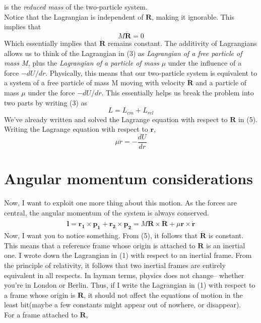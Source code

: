 \documentclass[12pt, letterpaper]{article}
\begin{document}
is the \textit{reduced mass} of the two-particle system. \\
Notice that the Lagrangian is independent of $\mathbf{R}$, making it ignorable. This implies that
\begin{equation}
    M\ddot{\mathbf{R}}=0
\end{equation}
Which essentially implies that $\mathbf{\dot{R}}$ remains constant.
The additivity of Lagrangians allows us to think of the Lagrangian in (3) as \textit{Lagrangian of a free particle of mass M}, plus the \textit{Lagrangian of a particle of mass $\mu$} under the influence of a force $-d U/d r$.
Physically, this means that our two-particle system is equivalent to a system of a free particle of mass M moving with velocity $\mathbf{\dot{R}}$ and a particle of mass $\mu$ under the force $-d U/d r$. This essentially helps us break the 
problem into two parts by writing (3) as  
\begin{equation}
    L = L_{cm}+L_{rel} 
\end{equation}
We've already written and solved the Lagrange equation with respect to $\mathbf{R}$ in (5). Writing the Lagrange equation with respect to $\mathbf{r}$,
\begin{equation}
    \mu\ddot{r}=-\frac{dU}{dr}
\end{equation}
\section{Angular momentum considerations}
Now, I want to exploit one more thing about this motion. As the forces are central, the angular momentum of the system is always conserved. 
\begin{align}
    \mathbf{l} = \mathbf{r_1}\times\mathbf{p_1}+\mathbf{r_2}\times\mathbf{p_2}=M\mathbf{R}\times\mathbf{\dot{R}}+\mu \mathbf{r}\times\mathbf{\dot{r}}
\end{align}
Now, I want you to notice something. From (5), it follows that $\mathbf{\dot{R}}$ is constant. This means that a reference frame whose origin is attached to $\mathbf{R}$ is an inertial one. I wrote down the Lagrangian in (1) with respect to an inertial frame. From the principle of relativity, 
it follows that two inertial frames are entirely equivalent in all respects. In layman terms, physics does not change-- whether you're in London or Berlin. 
Thus, if I write the Lagrangian in (1) with respect to a frame whose origin is $\mathbf{R}$, it should not affect the equations of motion in the least bit(maybe a few constants might appear out of nowhere, or disappear). \\
For a frame attached to $\mathbf{R}$,
\end{document}
